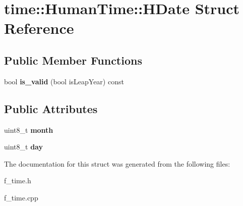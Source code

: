\hypertarget{structtime_1_1_human_time_1_1_h_date}{}\section{time\+::Human\+Time\+::H\+Date Struct Reference}
\label{structtime_1_1_human_time_1_1_h_date}
\subsection*{Public Member Functions}
\begin{DoxyCompactItemize}
\item 
\mbox{\label{structtime_1_1_human_time_1_1_h_date_acb9653acc0194218e5d3955265c31592}} 
bool {\bfseries is\+\_\+valid} (bool is\+Leap\+Year) const
\end{DoxyCompactItemize}
\subsection*{Public Attributes}
\begin{DoxyCompactItemize}
\item 
\mbox{\label{structtime_1_1_human_time_1_1_h_date_a8837bdc33e500e0a087c0ea34dc0d01b}} 
uint8\+\_\+t {\bfseries month}
\item 
\mbox{\label{structtime_1_1_human_time_1_1_h_date_a005d19cff62ed2eb268f2bdc4f24fd43}} 
uint8\+\_\+t {\bfseries day}
\end{DoxyCompactItemize}


The documentation for this struct was generated from the following files\+:\begin{DoxyCompactItemize}
\item 
f\+\_\+time.\+h\item 
f\+\_\+time.\+cpp\end{DoxyCompactItemize}
